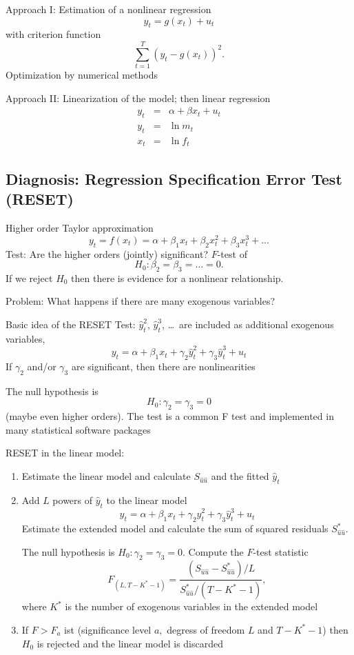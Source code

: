 \documentclass{article}
\begin{document}
Approach I: Estimation of a nonlinear regression
\[ y_{t}=g(x_{t})+u_{t} \]
with criterion function
\[ \sum_{t=1}^{T}\left( y_{t}-g(x_{t})\right)^2. \]
Optimization by numerical methods

Approach II: Linearization of the model; then linear regression
\begin{eqnarray*}
y_{t} &=&\alpha +\beta x_{t}+u_{t} \\
y_{t} &=&\ln m_{t} \\
x_{t} &=&\ln f_{t}
\end{eqnarray*}

\subsection*{Diagnosis: Regression Specification Error Test (RESET)}

Higher order Taylor approximation
\[ y_{t}=f(x_{t})=\alpha +\beta _{1}x_{t}+\beta _{2}x_{t}^{2}+\beta
_{3}x_{t}^{3}+\ldots \]
Test: Are the higher orders (jointly) significant?  $F$-test of
\[ H_0: \beta _{2}=\beta _{3}=\ldots =0. \]
If we reject $H_0$ then there is evidence for a nonlinear relationship.

Problem: What happens if there are many exogenous variables?

 Basic idea of the RESET Test: $\widehat{y}_{t}^{2}$, $\widehat{y}_{t}^{3}$,
\ldots\ are included as additional exogenous variables,
\[ y_{t}=\alpha +\beta _{1}x_{t}+\gamma _{2}\widehat{y}_{t}^{2}+\gamma _{3}
\widehat{y}_{t}^{3}+u_{t} \]
If $\gamma _{2}$ and/or $\gamma _{3}$ are significant, then there are
nonlinearities

The null hypothesis is
\[ H_0: \gamma _{2}=\gamma _{3}=0 \]
(maybe even higher orders). The test is a common F test and implemented in many statistical software packages

RESET in the linear model:
\begin{enumerate}
\item Estimate the linear model and calculate $S_{\widehat{u}\widehat{u}}$
and the fitted $\widehat{y}_{t}$
\item Add $L$ powers of  $\hat{y}_{t}$ to the linear model
\[ y_{t}=\alpha +\beta _{1}x_{t}+\gamma _{2}\hat{y}_{t}^{2}+\gamma _{3}\hat{y}_{t}^{3}+u_{t} \]
Estimate the extended model and calculate the sum of squared residuals 
$S_{\widehat{u}\widehat{u}}^{\ast }$.

 The null hypothesis is $H_{0}:\gamma _{2}=\gamma _{3}=0$. Compute the $F$-test statistic
\[ F_{(L,T-K^{\ast }-1)}=\frac{(S_{\widehat{u}\widehat{u}}-S_{\widehat{u}\widehat{u}}^*)/L}
{S_{\widehat{u}\widehat{u}}^{\ast }/(T-K^*-1)}, \]
where $K^*$ is the number of exogenous variables in the extended model

\item If $F>F_{a}$ ist (significance level $a,$ degress of freedom $L$ and $%
T-K^{\ast }-1$) then $H_{0}$ is rejected and the linear model is discarded 

\end{enumerate}
\end{document}
